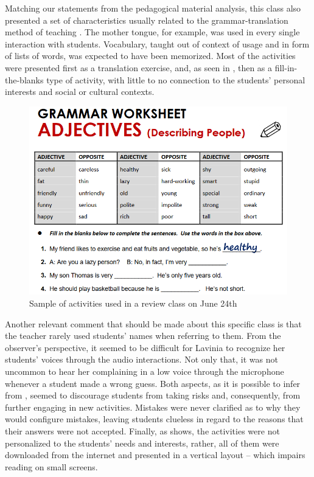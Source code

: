 \documentclass[english]{textolivre}
\begin{document}
Matching our statements from the pedagogical material analysis, this class also presented a set of characteristics usually related to the grammar-translation method of teaching \cite{brown2000douglas, harmer2007practice, richards2014approaches}. The mother tongue, for example, was used in every single interaction with students. Vocabulary, taught out of context of usage and in form of lists of words, was expected to have been memorized. Most of the activities were presented first as a translation exercise, and, as seen in , then as a fill-in-the-blanks type of activity, with little to no connection to the students’ personal interests and social or cultural contexts.

\begin{figure}[htbp]
\centering
\begin{minipage}{.8\textwidth}
 \includegraphics[width=\textwidth]{Fig2.png}
 \caption{Sample of activities used in a review class on June 24th}
 \label{fig02}
\end{minipage}
\end{figure}

Another relevant comment that should be made about this specific class is that the teacher rarely used students’ names when referring to them. From the observer’s perspective, it seemed to be difficult for Lavinia to recognize her students’ voices through the audio interactions. Not only that, it was not uncommon to hear her complaining in a low voice through the microphone whenever a student made a wrong guess. Both aspects, as it is possible to infer from , seemed to discourage students from taking risks and, consequently, from further engaging in new activities. Mistakes were never clarified as to why they would configure mistakes, leaving students clueless in regard to the reasons that their answers were not accepted. Finally, as  shows, the activities were not personalized to the students’ needs and interests, rather, all of them were downloaded from the internet and presented in a vertical layout – which impairs reading on small screens.
\end{document}
